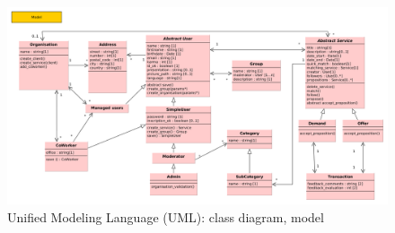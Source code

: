 \begin{landscape}
\newpage

\vspace*{\fill}
\begin{figure}[!ht]
	\begin{center}
		\includegraphics[width=.8\paperheight]{UML.png}
		\caption{Unified Modeling Language (UML): class diagram, model}
		\label{fig:uml_big}
	\end{center}
\end{figure}
\vspace*{\fill}

\end{landscape}